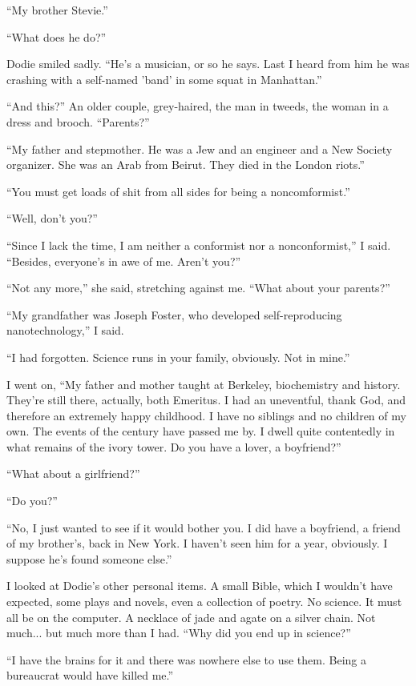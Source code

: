 \documentclass[english,11pt,letterpaper,onecolumn]{scrbook}
\begin{document}
	``My brother Stevie.''

	``What does he do?''

	Dodie smiled sadly.  ``He's a musician, or so he says.  Last I heard from him he was crashing with a self-named 'band' in some squat in Manhattan.''

	``And this?''  An older couple, grey-haired, the man in tweeds, the woman in a dress and brooch.  ``Parents?''

	``My father and stepmother.  He was a Jew and an engineer and a New Society organizer.  She was an Arab from Beirut.  They died in the London riots.''

	``You must get loads of shit from all sides for being a noncomformist.''

	``Well, don't you?''

	``Since I lack the time, I am neither a conformist nor a nonconformist,'' I said.  ``Besides, everyone's in awe of me.  Aren't you?''

	``Not any more,'' she said, stretching against me.  ``What about your parents?''

	``My grandfather was Joseph Foster, who developed self-reproducing nanotechnology,'' I said.

	``I had forgotten.  Science runs in your family, obviously.  Not in mine.''

	I went on, ``My father and mother taught at Berkeley, biochemistry and history.  They're still there, actually, both Emeritus.  I had an uneventful, thank God, and therefore an extremely happy childhood.  I have no siblings and no children of my own.  The events of the century have passed me by.  I dwell quite contentedly in what remains of the ivory tower.  Do you have a lover, a boyfriend?''

	``What about a girlfriend?''

	``Do you?''

	``No, I just wanted to see if it would bother you.  I did have a boyfriend, a friend of my brother's, back in New York.  I haven't seen him for a year, obviously.  I suppose he's found someone else.''

	I looked at Dodie's other personal items.  A small Bible, which I wouldn't have expected, some plays and novels, even a collection of poetry.  No science.  It must all be on the computer.  A necklace of jade and agate on a silver chain.  Not much... but much more than I had.  ``Why did you end up in science?''

	``I have the brains for it and there was nowhere else to use them.  Being a bureaucrat would have killed me.''
\end{document}

